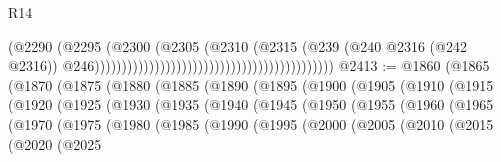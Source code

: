 \begin{lexlean}{R14}
\begin{coremodule}
{{{{{{{{{{{{{{{{{{{{{{{{{{{{{{{{{{{{{{{{{{{{{{{{{{{{{{{{{{{{{{{{{{{{{{{{{{{{{{{{{{{{{{{{{{{{{{{{{{{{{{{{{{                                                                              (@2290
                                                                                (@2295
                                                                                  (@2300
                                                                                    (@2305
                                                                                      (@2310
                                                                                        (@2315
                                                                                          (@239
                                                                                            (@240
                                                                                              @2316
                                                                                              (@242
                                                                                                @2316))
                                                                                            @246))))))))))))))))))))))))))))))))))))))))))))
@2413 := @1860
    (@1865
      (@1870
        (@1875
          (@1880
            (@1885
              (@1890
                (@1895
                  (@1900
                    (@1905
                      (@1910
                        (@1915
                          (@1920
                            (@1925
                              (@1930
                                (@1935
                                  (@1940
                                    (@1945
                                      (@1950
                                        (@1955
                                          (@1960
                                            (@1965
                                              (@1970
                                                (@1975
                                                  (@1980
                                                    (@1985
                                                      (@1990
                                                        (@1995
                                                          (@2000
                                                            (@2005
                                                              (@2010
                                                                (@2015
                                                                  (@2020
                                                                    (@2025
}}}}}}}}}}}}}}}}}}}}}}}}}}}}}}}}}}}}}}}}}}}}}}}}}}}}}}}}}}}}}}}}}}}}}}}}}}}}}}}}}}}}}}}}}}}}}}}}}}}}}}}}}}
\end{coremodule}
\end{lexlean}
